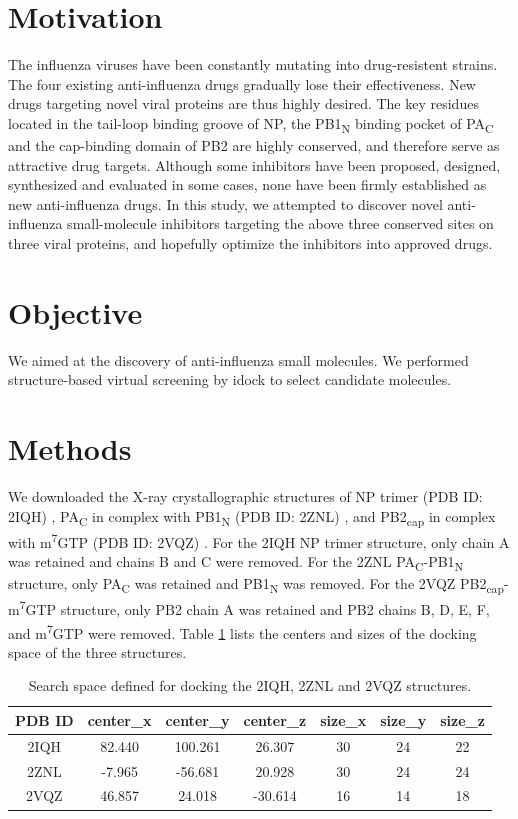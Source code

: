 \section{Motivation}

The influenza viruses have been constantly mutating into drug-resistent strains. The four existing anti-influenza drugs gradually lose their effectiveness. New drugs targeting novel viral proteins are thus highly desired. The key residues located in the tail-loop binding groove of NP, the PB1\textsubscript{N} binding pocket of PA\textsubscript{C} and the cap-binding domain of PB2 are highly conserved, and therefore serve as attractive drug targets. Although some inhibitors have been proposed, designed, synthesized and evaluated in some cases, none have been firmly established as new anti-influenza drugs. In this study, we attempted to discover novel anti-influenza small-molecule inhibitors targeting the above three conserved sites on three viral proteins, and hopefully optimize the inhibitors into approved drugs.

\section{Objective}

We aimed at the discovery of anti-influenza small molecules. We performed structure-based virtual screening by idock \citep{1153} to select candidate molecules.

\section{Methods}

We downloaded the X-ray crystallographic structures of NP trimer (PDB ID: 2IQH) \citep{1140}, PA\textsubscript{C} in complex with PB1\textsubscript{N} (PDB ID: 2ZNL) \citep{1141}, and PB2\textsubscript{cap} in complex with m\textsuperscript{7}GTP (PDB ID: 2VQZ) \citep{1192}. For the 2IQH NP trimer structure, only chain A was retained and chains B and C were removed. For the 2ZNL PA\textsubscript{C}-PB1\textsubscript{N} structure, only PA\textsubscript{C} was retained and PB1\textsubscript{N} was removed. For the 2VQZ PB2\textsubscript{cap}-m\textsuperscript{7}GTP structure, only PB2 chain A was retained and PB2 chains B, D, E, F, and m\textsuperscript{7}GTP were removed. Table \ref{influenza:SearchSpace} lists the centers and sizes of the docking space of the three structures.

\begin{table}
\caption{Search space defined for docking the 2IQH, 2ZNL and 2VQZ structures.}
\label{influenza:SearchSpace}
\begin{tabular}{ccccccc}
\hline
PDB ID & center\_x & center\_y & center\_z & size\_x & size\_y & size\_z\\
\hline
2IQH & 82.440 & 100.261 & 26.307 & 30 & 24 & 22\\
2ZNL & -7.965 & -56.681 & 20.928 & 30 & 24 & 24\\
2VQZ & 46.857 & 24.018 & -30.614 & 16 & 14 & 18\\
\hline
\end{tabular}
\end{table}

